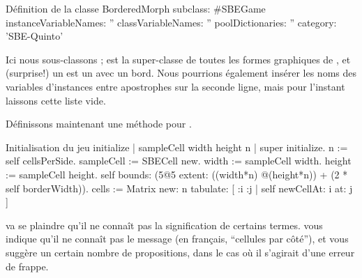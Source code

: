 \documentclass[a4paper,10pt,twoside]{book}
\begin{document}
\begin{classdef}[sbegame]{Définition de la classe }
BorderedMorph subclass: #SBEGame
   instanceVariableNames: ''
   classVariableNames: ''
   poolDictionaries: ''
   category: 'SBE-Quinto'
\end{classdef}

Ici nous sous-classons ;  est la
super-classe de toutes les formes graphiques de \sq, et (surprise!)
un  est un  avec un bord.  
Nous pourrions également insérer les noms des variables d'instances
entre apostrophes sur la seconde ligne, mais pour l'instant 
laissons cette liste vide.

Définissons maintenant une méthode  pour .


\begin{numMethod}[sbegameinitialize]{Initialisation du jeu}
initialize
   | sampleCell width height n |
   super initialize.
   n := self cellsPerSide.
   sampleCell := SBECell new.
   width := sampleCell width.
   height := sampleCell height.
   self bounds: (5@5 extent: ((width*n) @(height*n)) + (2 * self borderWidth)).
   cells := Matrix new: n tabulate: [ :i :j | self newCellAt: i at: j ]
\end{numMethod}


\sq va se plaindre qu'il ne conna\^it pas la signification de
certains termes.
\sq vous indique qu'il ne conna\^it pas le message
 (en fran\c{c}ais, ``cellules par c\^oté''), et
vous suggère un certain nombre de propositions, dans le cas o\`u il
s'agirait d'une erreur de frappe.
\end{document}
